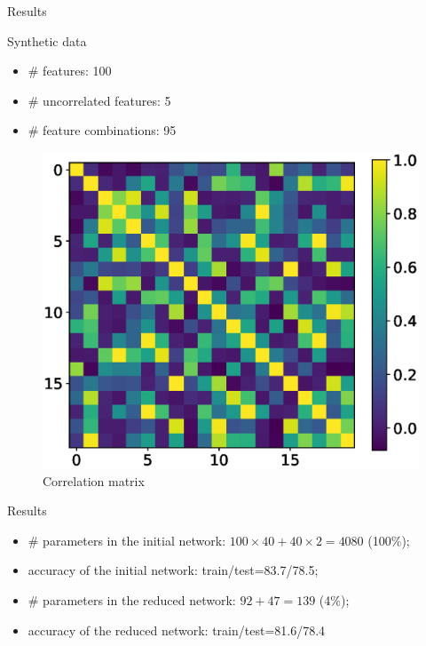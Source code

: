 \documentclass[9pt]{beamer}
\begin{document}
\begin{frame}{Results}
		\begin{minipage}{0.6\linewidth}
		\begin{block}{Synthetic data}
			\begin{itemize}
				\item \# features: 100
				\item \# uncorrelated features: 5
				\item \# feature combinations: 95
			\end{itemize}
		\end{block}
		\end{minipage}%
		\begin{minipage}{0.4\linewidth}
		\begin{figure}
			\includegraphics[width=0.9\linewidth]{figs/corr}
			\caption{Correlation matrix}
		\end{figure}
		\end{minipage}
	\begin{block}{Results}
		\begin{itemize}
			\item \# parameters in the initial network: $100 \times 40 + 40 \times 2 = 4080$ (100\%);
			\item accuracy of the initial network: train/test=83.7/78.5;
			\item \# parameters in the reduced network: $92 + 47 = 139$ (4\%);
			\item accuracy of the reduced network: train/test=81.6/78.4
		\end{itemize}
	\end{block}
\end{frame}
\end{document}
